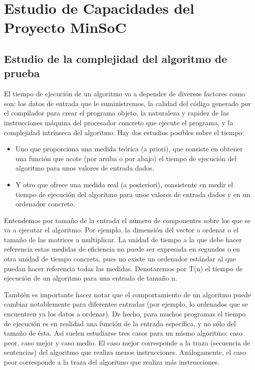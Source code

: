 \newpage
\section {Estudio de Capacidades del Proyecto MinSoC}
		
		\subsection{Estudio de la complejidad del algoritmo de prueba}
		
		El tiempo de ejecución de un algoritmo va a depender de diversos factores como son: los datos de entrada que le suministremos, la calidad del
		código generado por el compilador para crear el programa objeto, la naturaleza y rapidez  de las instrucciones máquina del procesador concreto que
		ejecute el programa, y la complejidad intrínseca del algoritmo. Hay dos estudios posibles sobre el tiempo: 
 
		\begin{itemize}
		  \item Uno que proporciona una medida teórica (a priori), que consiste en obtener una  función que acote (por arriba o por abajo) el tiempo de
		  ejecución del algoritmo para unos valores de entrada dados.
		\item Y otro que ofrece una medida real (a posteriori), consistente en medir el tiempo  de ejecución del algoritmo para unos valores de entrada
		dados y en un ordenador concreto. 
		\end{itemize} 
		
		Entendemos por tamaño de la entrada el número de componentes sobre los que  se va a ejecutar el algoritmo. Por ejemplo, la dimensión del vector a
		ordenar o el tamaño de las matrices a multiplicar. La unidad de tiempo a la que debe hacer referencia estas medidas de eficiencia  no puede ser
		expresada en segundos o en otra unidad de tiempo concreta, pues no existe un ordenador estándar al que puedan hacer referencia todas las medidas. 
        Denotaremos por T(n) el tiempo de ejecución de un algoritmo para una entrada de tamaño n. 
        
        También es importante hacer notar que el comportamiento de un algoritmo puede cambiar notablemente para diferentes entradas (por ejemplo, lo
        ordenados que se encuentren ya los datos a ordenar). De hecho, para muchos programas el tiempo de ejecución es en realidad una función de la
        entrada específica, y no sólo del tamaño de ésta. Así suelen estudiarse tres casos para un mismo algoritmo: caso peor, caso mejor y caso
        medio. El caso mejor corresponde a la traza (secuencia de sentencias) del algoritmo que realiza menos instrucciones. Análogamente, el caso
        peor corresponde a la traza del algoritmo que realiza más instrucciones.
 		
